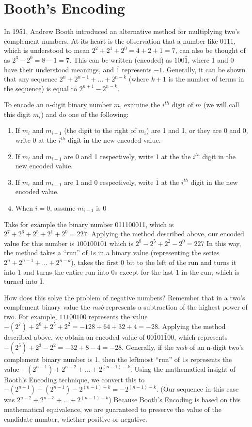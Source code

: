 \documentclass{article}
\begin{document}
\section{Booth's Encoding}
In 1951, Andrew Booth introduced an alternative method for multiplying two's complement numbers.
At its heart is the observation that a number like 0111, which is understood to mean $2^2 + 2^1 + 2^0 = 4 + 2 + 1 = 7$, can also be thought of as $2^3 - 2^0 = 8 - 1 = 7$.
This can be written (encoded) as $100\bar{1}$, where 1 and 0 have their understood meanings, and $\bar{1}$ represents $-1$.
Generally, it can be shown that any sequence $2^n + 2^{n-1} + ... + 2^{n-k}$ (where $k+1$ is the number of terms in the sequence) is equal to $2^{n+1} - 2^{n-k}$.

To encode an $n$-digit binary number $m$, examine the $i^{th}$ digit of $m$ (we will call this digit $m_i$) and do one of the following: %

\begin{enumerate}
\item If $m_i$ and $m_{i-1}$ (the digit to the right of $m_i$) are 1 and 1, or they are 0 and 0, write 0 at the $i^{th}$ digit in the new encoded value.
\item If $m_i$ and $m_{i-1}$ are 0 and 1 respectively, write 1 at the the $i^{th}$ digit in the new encoded value.
\item If $m_i$ and $m_{i-1}$ are 1 and 0 respectively, write $\bar{1}$ at the $i^{th}$ digit in the new encoded value.
\item When $i = 0$, assume $m_{i-1}$ is 0
\end{enumerate}

Take for example the binary number 011100011, which is $2^7 + 2^6 + 2^5 + 2^1 + 2^0 = 227$.
Applying the method described above, our encoded value for this number is $100\bar{1}0010\bar{1}$ which is $2^8 - 2^5 + 2^2 - 2^0 = 227$
In this way, the method takes a ``run'' of $1$s in a binary value (representing the series $2^{n} + 2^{n-1} + ...
+ 2^{n-k}$), takes the first 0 bit to the left of the run and turns it into $1$ and turns the entire run into $0$s except for the last $1$ in the run, which is turned into $\bar{1}$.

How does this solve the problem of negative numbers?
Remember that in a two's complement binary value the \emph{msb} represents a subtraction of the highest power of two.
For example, $11100100$ represents the value $-(2^{7}) + 2^{6} + 2^{5} + 2^{2} = -128 + 64 + 32 + 4 = -28$.
Applying the method described above, we obtain an encoded value of $00\bar{1}01\bar{1}00$, which represents $-(2^{5}) + 2^{3} - 2^{2} = -32 + 8 - 4 = -28$.
Generally, if the \emph{msb} of an n-digit two's complement binary number is 1, then the leftmost ``run'' of $1$s represents the value $-(2^{n-1}) + 2^{n-2} + ...
+ 2^{(n-1)-k}$.
Using the mathematical insight of Booth's Encoding technique, we convert this to $-(2^{n-1}) + (2^{n-1}) - 2^{(n-1)-k} = -2^{(n-1)-k}$.
(Our sequence in this case was $2^{n-2} + 2^{n-3} + ...
+ 2^{(n-1)-k}$)
Because Booth's Encoding is based on this mathematical equivalence, we are guaranteed to preserve the value of the candidate number, whether positive or negative.
 
\end{document}
